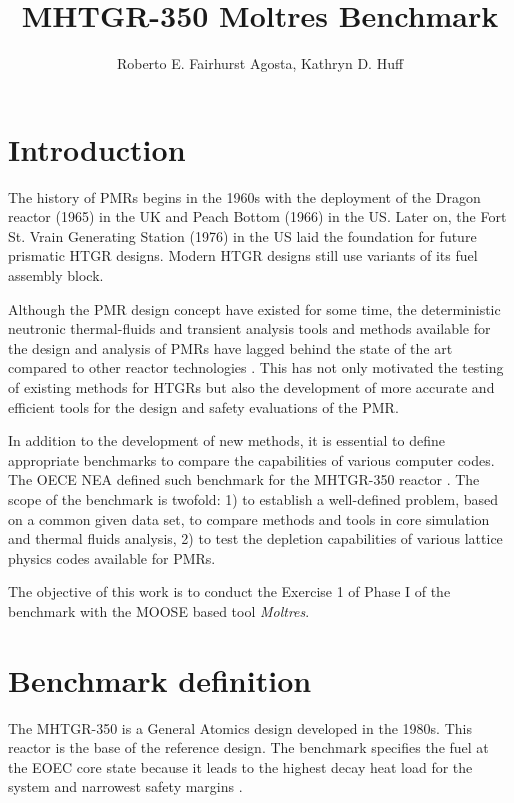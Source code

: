 \documentclass{anstrans}
\title{MHTGR-350 Moltres Benchmark}
\author{Roberto E. Fairhurst Agosta, Kathryn D. Huff}
\institute{
University of Illinois at Urbana-Champaign, Dept. of Nuclear, Plasma, and Radiological Engineering\\
ref3@illinois.edu
}
\begin{document}
\section{Introduction}

The history of \glspl{PMR} begins in the 1960s with the deployment of the Dragon reactor (1965) in the \gls{UK} and Peach Bottom (1966) in the \gls{US}.
Later on, the Fort St. Vrain Generating Station (1976) in the \gls{US} laid the foundation for future prismatic \gls{HTGR} designs.
Modern \gls{HTGR} designs still use variants of its fuel assembly block.

Although the \gls{PMR} design concept have existed for some time, the deterministic neutronic thermal-fluids and transient analysis tools and methods available for the  design and analysis of \glspl{PMR} have lagged behind the state of the art compared to other reactor technologies \cite{oecd_nea_benchmark_2017}.
This has not only motivated the testing of existing methods for \glspl{HTGR} but also the development of more accurate and efficient tools for the design and safety evaluations of the \gls{PMR}.

In addition to the development of new methods, it is essential to define appropriate benchmarks to compare the capabilities of various computer codes.
The OECE \gls{NEA} defined such benchmark for the MHTGR-350 reactor \cite{oecd_nea_benchmark_2017}.
The scope of the benchmark is twofold: 1) to establish a well-defined problem, based on a common given data set, to compare methods and tools in core simulation and thermal fluids analysis, 2) to test the depletion capabilities of various lattice physics codes available for \glspl{PMR}.

The objective of this work is to conduct the Exercise 1 of Phase I of the benchmark with the \gls{MOOSE} \cite{gaston_physics-based_2015} based tool \textit{Moltres}\cite{lindsay_introduction_2018}.

\section{Benchmark definition}

The MHTGR-350 is a General Atomics design developed in the 1980s.
This reactor is the base of the reference design.
The benchmark specifies the fuel at the \gls{EOEC} core state because it leads to the highest decay heat load for the system and narrowest safety margins \cite{ortensi_prismatic_2011}.
\end{document}

